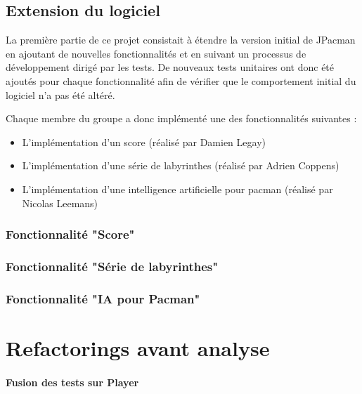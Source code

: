 \documentclass[12pt, openany]{report}
\begin{document}
\section{Extension du logiciel}

La première partie de ce projet consistait à étendre la version initial de JPacman en ajoutant de nouvelles fonctionnalités et en suivant un processus de développement dirigé par les tests. De nouveaux tests unitaires ont donc été ajoutés pour chaque fonctionnalité afin de vérifier que le comportement initial du logiciel n’a pas été altéré. 

Chaque membre du groupe a donc implémenté une des fonctionnalités suivantes :
\begin{itemize}
\item L'implémentation d'un score (réalisé par Damien Legay)
\item L'implémentation d'une série de labyrinthes (réalisé par Adrien Coppens)
\item L'implémentation d'une intelligence artificielle pour pacman (réalisé par Nicolas Leemans)

\end{itemize}

\subsection{Fonctionnalité "Score"}
\subsection{Fonctionnalité "Série de labyrinthes"}
\subsection{Fonctionnalité "IA pour Pacman"}











\chapter{Refactorings avant analyse}

\subsubsection{Fusion des tests sur \og Player \fg}
\end{document}

